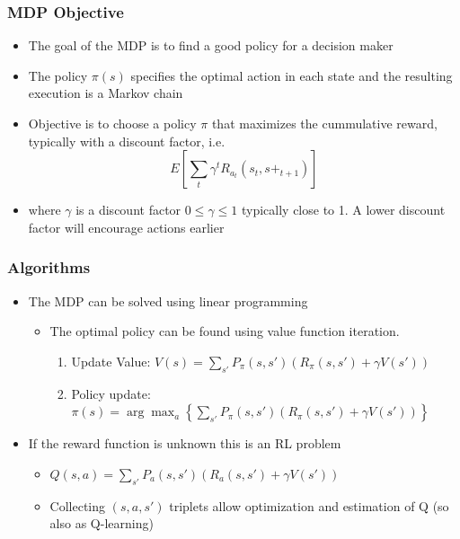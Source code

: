 \documentclass[10pt]{beamer}
\begin{document}
\begin{frame}
  \frametitle{MDP Objective}
  \begin{itemize}
  \item The goal of the MDP is to find a good policy for a decision maker
  \item The policy $\pi(s)$ specifies the optimal action in each state
    and the resulting execution is a Markov chain
  \item Objective is to choose a policy $\pi$ that maximizes the cummulative reward, typically with a discount factor, i.e.
    \[ E\left[  \sum_t \gamma^t R_{a_t}(s_t, s+_{t+1}) \right] \]
  \item where $\gamma$ is a discount factor $0 \leq \gamma \leq 1$
    typically close to 1. A lower discount factor will encourage
    actions earlier
  \end{itemize}
\end{frame}

\begin{frame}
  \frametitle{Algorithms}
  \begin{itemize}
  \item The MDP can be solved using linear programming
    \begin{itemize}
    \item The optimal policy can be found using value function iteration.
      \begin{enumerate}
      \item Update Value: $V(s) = \sum_{s'} P_{\pi}(s,s') (R_{\pi}(s,s') + \gamma V(s'))$
      \item Policy update: $\pi(s) = \arg\max_a \left\{ \sum_{s'} P_{\pi}(s,s') (R_{\pi}(s,s') + \gamma V(s'))\right\}$
      \end{enumerate}
    \end{itemize}
  \item If the reward function is unknown this is an RL problem
    \begin{itemize}
    \item $Q(s,a) = \sum_{s'} P_{a}(s,s') (R_{a}(s,s') + \gamma V(s'))$
    \item Collecting $(s,a,s')$ triplets allow optimization and estimation of Q (so also as Q-learning)
    \end{itemize}
  \end{itemize}
\end{frame}
\end{document}
